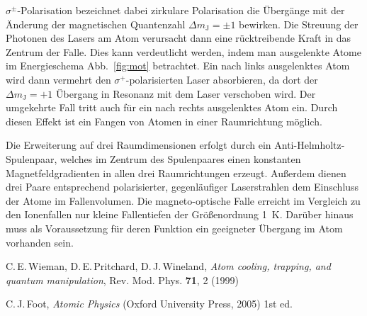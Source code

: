 \documentclass[twocolumn]{revtex4}
\begin{document}
$\sigma^\pm$-Polarisation bezeichnet dabei zirkulare Polarisation die Übergänge mit der Änderung der magnetischen Quantenzahl $\Delta m_\mathrm{J} = \pm 1$ bewirken.
Die Streuung der Photonen des Lasers am Atom verursacht dann eine rücktreibende Kraft in das Zentrum der Falle.
Dies kann verdeutlicht werden, indem man ausgelenkte Atome im Energieschema Abb.~\ref{fig:mot} betrachtet.
Ein nach links ausgelenktes Atom wird dann vermehrt den $\sigma^+$-polarisierten Laser absorbieren, da dort der $\Delta m_\mathrm{J} = +1$ Übergang in Resonanz mit dem Laser verschoben wird. Der umgekehrte Fall tritt auch für ein nach rechts ausgelenktes Atom ein.
Durch diesen Effekt ist ein Fangen von Atomen in einer Raumrichtung möglich.

Die Erweiterung auf drei Raumdimensionen erfolgt durch ein Anti-Helmholtz-Spulenpaar, welches im Zentrum des Spulenpaares einen konstanten Magnetfeldgradienten in allen drei Raumrichtungen erzeugt.
Außerdem dienen drei Paare entsprechend polarisierter, gegenläufiger Laserstrahlen dem Einschluss der Atome im Fallenvolumen.
Die magneto-optische Falle erreicht im Vergleich zu den Ionenfallen nur kleine Fallentiefen der Größenordnung \SI{1}{K}.
Darüber hinaus muss als Voraussetzung für deren Funktion ein geeigneter Übergang im Atom vorhanden sein.

\begin{thebibliography}{}
C.\,E.\,Wieman, D.\,E.\,Pritchard, D.\,J.\,Wineland, {\it Atom cooling, trapping, and quantum manipulation}, Rev. Mod. Phys. \textbf{71}, 2 (1999)

C.\,J.\,Foot, {\it Atomic Physics} (Oxford University Press, 2005) 1st ed.
\end{thebibliography}
\end{document}
